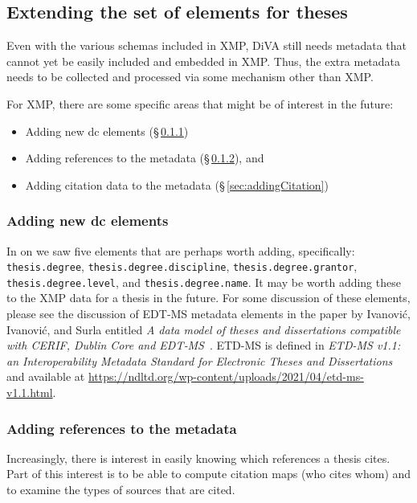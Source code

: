 \documentclass[12pt, twoside]{article}
\begin{document}
\subsection{Extending the set of elements for theses}
\label{sec:newMetadataForTheses}
Even with the various schemas included in \gls{XMP}, DiVA still needs metadata that cannot yet be easily included and embedded in \gls{XMP}. Thus, the extra metadata needs to be collected and processed via some mechanism other than \gls{XMP}.

For \gls{XMP}, there are some specific areas that might be of interest in the future:
\begin{itemize}
  \item Adding new dc elements (§\,\ref{sec:newDCelements}) 
  \item Adding references to the metadata (§\,\ref{sec:addingReferences}), and 
  \item Adding citation data to the metadata (§\,\ref{sec:addingCitation})
\end{itemize}

\subsubsection{Adding new dc elements}
\label{sec:newDCelements}
In  on \pageref{tab:dublinCoreDigitalCommons} we saw five elements that are perhaps worth adding, specifically:
\texttt{thesis.degree}, \texttt{thesis.degree.discipline}, \linebreak[4]\texttt{thesis.degree.grantor}, \texttt{thesis.degree.level}, and \linebreak[4] \texttt{thesis.degree.name}. It may be worth adding these to the XMP data for a thesis in the future. For some discussion of these elements, please see the discussion of EDT‐MS metadata elements in the paper by Ivanović, Ivanović, and Surla entitled \textit{A data model of theses and dissertations compatible with {CERIF}, {Dublin} {Core} and {EDT}‐{MS}}~\cite{ivanovic_data_2012}. ETD-MS is defined in \textit{ETD-MS v1.1: an Interoperability Metadata Standard for Electronic Theses and Dissertations}~\cite{hickey_pavani_suleman_2010} and available at \url{https://ndltd.org/wp-content/uploads/2021/04/etd-ms-v1.1.html}.


\subsubsection{Adding references to the metadata}
\label{sec:addingReferences}
Increasingly, there is interest in easily knowing which references a thesis cites. Part of this interest is to be able to compute citation maps (who cites whom) and to examine the types of sources that are cited.
\end{document}
